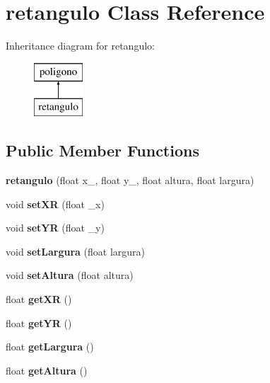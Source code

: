 \hypertarget{classretangulo}{}\section{retangulo Class Reference}
\label{classretangulo}
Inheritance diagram for retangulo\+:\begin{figure}[H]
\begin{center}
\leavevmode
\includegraphics[height=2.000000cm]{classretangulo}
\end{center}
\end{figure}
\subsection*{Public Member Functions}
\begin{DoxyCompactItemize}
\item 
\mbox{\label{classretangulo_ae4798266f2ab4b22ab5c90538d2f325e}} 
{\bfseries retangulo} (float x\+\_\+, float y\+\_\+, float altura, float largura)
\item 
\mbox{\label{classretangulo_a85473f314a045e4660e4441e6fd094a2}} 
void {\bfseries set\+XR} (float \+\_\+x)
\item 
\mbox{\label{classretangulo_a537fa77cb92b402d8813eb4c07f7ac4a}} 
void {\bfseries set\+YR} (float \+\_\+y)
\item 
\mbox{\label{classretangulo_a4a45f92c2a786cab5d7d51624f733273}} 
void {\bfseries set\+Largura} (float largura)
\item 
\mbox{\label{classretangulo_a5b21ff5724a23f455bcec0e405d96185}} 
void {\bfseries set\+Altura} (float altura)
\item 
\mbox{\label{classretangulo_a8e6a38a265c3ad1d80ab7f4917c149c5}} 
float {\bfseries get\+XR} ()
\item 
\mbox{\label{classretangulo_a74963fa0d52e94181142cceb460db188}} 
float {\bfseries get\+YR} ()
\item 
\mbox{\label{classretangulo_aaafb6b2830fd492f5622ec7501aaf684}} 
float {\bfseries get\+Largura} ()
\item 
\mbox{\label{classretangulo_ab7f54ba43a0def6ba98497654792a11d}} 
float {\bfseries get\+Altura} ()
\end{DoxyCompactItemize}
